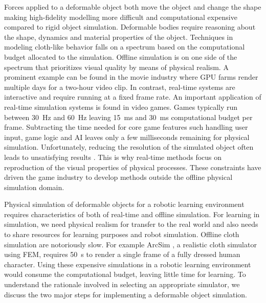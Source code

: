 \documentclass[\home/main.tex]{subfiles}
\begin{document}
Forces applied to a deformable object both move the object and change the shape making high-fidelity modelling more difficult and computational expensive compared to rigid object simulation. Deformable bodies require reasoning about the shape, dynamics and material properties of the object. Techniques in modeling cloth-like behavior falls on a spectrum based on the computational budget allocated to the simulation. Offline simulation is on one side of the spectrum that prioritizes visual quality by means of physical realism. A prominent example can be found in the movie industry where \gls{GPU} farms render multiple days for a two-hour video clip. In contrast, real-time systems are interactive and require running at a fixed frame rate. An important application of real-time simulation systems is found in video games. Games typically run between \SI{30}{\hertz} and \SI{60}{\hertz} leaving \SI{15}{\milli\second} and \SI{30}{\milli\second} computational budget per frame. Subtracting the time needed for core game features such handling user input, game logic and \gls{AI} leaves only a few milliseconds remaining for physical simulation. Unfortunately, reducing the resolution of the simulated object often leads to unsatisfying results \autocite{muller2008real}. This is why real-time methods focus on reproduction of the visual properties of physical processes. These constraints have driven the game industry to develop methods outside the offline physical simulation domain.

Physical simulation of deformable objects for a robotic learning environment requires characteristics of both of real-time and offline simulation. For learning in simulation, we need physical realism for transfer to the real world and also needs to share resources for learning purposes and robot simulation. Offline cloth simulation are notoriously slow. For example ArcSim \autocite{narain2012adaptive}, a realistic cloth simulator using \gls{FEM}, requires \SI{50}{\second} to render a single frame of a fully dressed human character. Using these expensive simulations in a robotic learning environment would consume the computational budget, leaving little time for learning. To understand the rationale involved in selecting an appropriate simulator, we discuss the two major steps for implementing a deformable object simulation.
\end{document}
